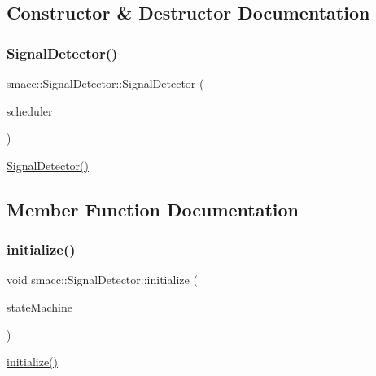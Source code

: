 \subsection{Constructor \& Destructor Documentation}
\mbox{\label{classsmacc_1_1SignalDetector_aeaefdb0fe56cc527486598417f605c37}} 
\subsubsection{\texorpdfstring{Signal\+Detector()}{SignalDetector()}}
{\footnotesize\ttfamily smacc\+::\+Signal\+Detector\+::\+Signal\+Detector (\begin{DoxyParamCaption}\item[{Smacc\+Scheduler $\ast$}]{scheduler }\end{DoxyParamCaption})}

\hyperlink{classsmacc_1_1SignalDetector_aeaefdb0fe56cc527486598417f605c37}{Signal\+Detector()} 

\subsection{Member Function Documentation}
\mbox{\label{classsmacc_1_1SignalDetector_a91ab3cd92d8095cdaf8610b50731f04b}} 
\subsubsection{\texorpdfstring{initialize()}{initialize()}}
{\footnotesize\ttfamily void smacc\+::\+Signal\+Detector\+::initialize (\begin{DoxyParamCaption}\item[{\hyperlink{classsmacc_1_1ISmaccStateMachine}{I\+Smacc\+State\+Machine} $\ast$}]{state\+Machine }\end{DoxyParamCaption})}

\hyperlink{classsmacc_1_1SignalDetector_a91ab3cd92d8095cdaf8610b50731f04b}{initialize()} \mbox{\label{classsmacc_1_1SignalDetector_a636f704e469bf74b4a9fdb15bd63d5be}} 
